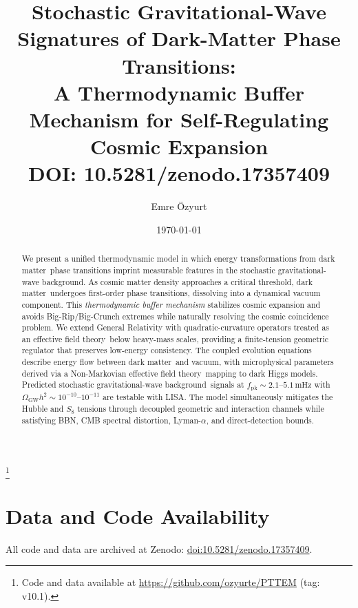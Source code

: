 \documentclass[preprint,aps,prd,onecolumn,nofootinbib,longbibliography]{revtex4-2}
\newcommand{\DM}{dark matter}
\newcommand{\SGWB}{stochastic gravitational-wave background}
\newcommand{\FOPT}{first-order phase transition}
\newcommand{\EFT}{effective field theory}
\numberwithin{equation}{section}
\begin{document}
\title{
Stochastic Gravitational-Wave Signatures of Dark-Matter Phase Transitions:\\
A Thermodynamic Buffer Mechanism for Self-Regulating Cosmic Expansion\\[0.5em]
\textbf{DOI:} 10.5281/zenodo.17357409
}

\author{Emre \"Ozyurt}
\thanks{Code and data available at \url{https://github.com/ozyurte/PTTEM} (tag: v10.1).}

\date{\today}


\begin{abstract}
We present a unified thermodynamic model in which energy transformations from \DM\ phase transitions imprint measurable features in the \SGWB. As cosmic matter density approaches a critical threshold, \DM\ undergoes \FOPT s, dissolving into a dynamical vacuum component. This \emph{thermodynamic buffer mechanism} stabilizes cosmic expansion and avoids Big-Rip/Big-Crunch extremes while naturally resolving the cosmic coincidence problem. We extend General Relativity with quadratic-curvature operators treated as an \EFT\ below heavy-mass scales, providing a finite-tension geometric regulator that preserves low-energy consistency. The coupled evolution equations describe energy flow between \DM\ and vacuum, with microphysical parameters derived via a Non-Markovian \EFT\ mapping to dark Higgs models. Predicted \SGWB\ signals at $f_{\mathrm{pk}}\sim 2.1$--$5.1\,\mathrm{mHz}$ with $\Omega_{\mathrm{GW}}h^2\sim 10^{-10}$--$10^{-11}$ are testable with LISA. The model simultaneously mitigates the Hubble and $S_8$ tensions through decoupled geometric and interaction channels while satisfying BBN, CMB spectral distortion, Lyman-$\alpha$, and direct-detection bounds.
\end{abstract}

\maketitle
\vspace*{3\baselineskip}
\thispagestyle{empty}
\clearpage

\section*{Data and Code Availability}
All code and data are archived at Zenodo:
\href{https://doi.org/10.5281/zenodo.17357409}{doi:10.5281/zenodo.17357409}.
\end{document}

